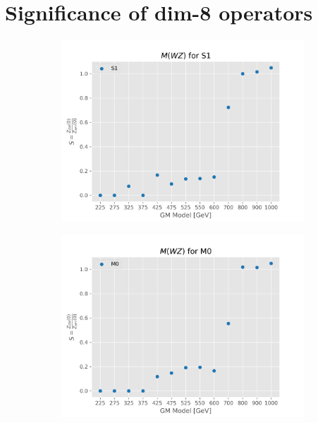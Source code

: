 \documentclass[../Bachelorarbeit.tex]{subfiles}
\begin{document}
\captionsetup[figure]{list=no}

\section{Significance of dim-8 operators }


\begin{figure}[h]
    \centering
    \begin{subfigure}{0.45\textwidth}
        \includegraphics[width=\textwidth]{Plots/gm_relevanze/MWZ_op_S1.png}
        \caption{}
    \end{subfigure}
    \begin{subfigure}{0.45\textwidth}
        \includegraphics[width=\textwidth]{Plots/gm_relevanze/MWZ_op_M0.png}

\end{subfigure}
\end{figure}
\end{document}
